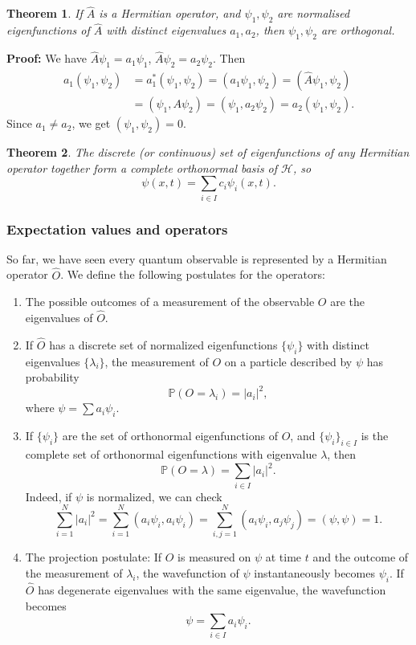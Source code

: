 \documentclass[12pt]{article}
\newtheorem{theorem}{Theorem}[section]
\theoremstyle{definition}
\theoremstyle{remark}
\begin{document}
\begin{theorem}
	If $\hat A$ is a Hermitian operator, and $\psi_1, \psi_2$ are normalised eigenfunctions of $\hat A$ with distinct eigenvalues $a_1, a_2$, then $\psi_1, \psi_2$ are orthogonal.
\end{theorem}

\begin{adjustbox}{minipage = \columnwidth - 25.5pt, margin=1em, frame=1pt, margin=0em}
\textbf{Proof:} We have $\hat A \psi_1 = a_1\psi_1$, $\hat A \psi_2 = a_2 \psi_2$. Then
\begin{align*}
	a_1(\psi_1, \psi_2) &= a_1^{\ast}(\psi_1, \psi_2) = (a_1 \psi_1, \psi_2) = (\hat A\psi_1, \psi_2) \\
			    &= (\psi_1, A \psi_2) = (\psi_1, a_2 \psi_2) = a_2(\psi_1, \psi_2).
\end{align*}
Since $a_1 \neq a_2$, we get $(\psi_1, \psi_2) = 0$.
\end{adjustbox}

\begin{theorem}
	The discrete (or continuous) set of eigenfunctions of any Hermitian operator together form a complete orthonormal basis of $\mathcal{H}$, so
	\[
		\psi(x, t) = \sum_{i \in I}c_i \psi_i(x, t)
	.\]
\end{theorem}

\subsubsection{Expectation values and operators}%
\label{subsub:expectation_values_and_operators}

So far, we have seen every quantum observable is represented by a Hermitian operator $\hat O$. We define the following postulates for the operators:

\begin{enumerate}[1.]
	\item The possible outcomes of a measurement of the observable $O$ are the eigenvalues of $\hat O$.
	\item If $\hat O$ has a discrete set of normalized eigenfunctions $\{\psi_i\}$ with distinct eigenvalues $\{\lambda_i\}$, the measurement of $O$ on a particle described by $\psi$ has probability
		\[
			\mathbb{P}(O = \lambda_i) = |a_i|^2
		,\]
		where $\psi = \sum a_i \psi_i$.
	\item If $\{\psi_i\}$ are the set of orthonormal eigenfunctions of $\hat O$, and $\{\psi_i\}_{i \in I}$ is the complete set of orthonormal eigenfunctions with eigenvalue $\lambda$, then
		\[
			\mathbb{P}(O = \lambda) = \sum_{i \in I}|a_i|^2
		.\]
		Indeed, if $\psi$ is normalized, we can check
		\[
			\sum_{i = 1}^{N} |a_i|^2 = \sum_{i = 1}^{N}(a_i \psi_i, a_i \psi_i) = \sum_{i, j = 1}^{N} (a_i \psi_i, a_j \psi_j) = (\psi, \psi) = 1
		.\]
	\item The projection postulate: If $O$ is measured on $\psi$ at time $t$ and the outcome of the measurement of $\lambda_i$, the wavefunction of $\psi$ instantaneously becomes $\psi_i$. If $\hat O$ has degenerate eigenvalues with the same eigenvalue, the wavefunction becomes
		\[
		\psi = \sum_{i \in I}a_i \psi_i
		.\]
\end{enumerate}
\end{document}
